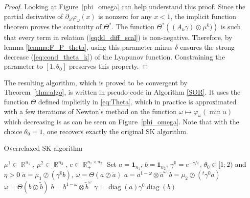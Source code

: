 \documentclass{article} %
\DeclareMathOperator{\IR}{\mathbb{R}}
\DeclareMathOperator{\diag}{diag}
\renewcommand{\epsilon}{\varepsilon}
\theoremstyle{plain}
\theoremstyle{definition}
\theoremstyle{remark}
\begin{document}
\begin{proof}
Looking at Figure~\ref{phi_omega} can help understand this proof.	Since the partial derivative of $\partial_\omega \varphi_\omega(x)$ is nonzero for any $x<1$, the implicit function theorem proves the continuity of $\Theta^*$.
	The function $\Theta^*\left((A_k \gamma)\oslash \mu^k)\right)$ is such that every term in relation (\ref{eq:kl_diff_scal}) is non-negative.
	Therefore, by lemma \ref{lemma:F_P_theta}, using this parameter minus $\delta$ ensures the strong decrease (\ref{eq:cond_theta_k}) of the Lyapunov function.
	Constraining the parameter to $[1,\theta_0]$ preserves this property.%
\end{proof}

The resulting algorithm, which is proved to be convergent by Theorem~\ref{thm:algo}, is written in pseudo-code in Algorithm \ref{SOR}. It uses the function $\Theta$ defined implicitly in \eqref{eq:Theta}, which in practice is approximated with a few iterations of Newton's method on the function $\omega \mapsto \varphi_\omega(\min u)$ which decreasing is as can be seen on Figure~\ref{phi_omega}. Note that with the choice $\theta_0=1$, one recovers exactly the original SK algorithm.

\begin{algorithm}
\caption{Overrelaxed SK algorithm }
\label{SOR}
\begin{algorithmic}
\REQUIRE $\mu^1\in \IR^{n_1}$, $\mu^2\in \IR^{n_2}$, $c\in \IR^{n_1\times n_2}_+$
\STATE Set $a=\mathbf{1}_{n_1}$, $b=\mathbf{1}_{n_2}$, $\gamma^0=e^{-c/\epsilon}$, $\theta_0\in[1;2)$ and $\eta>0$
\STATE $\tilde a=\mu_1\oslash (\gamma^0 b)$, 
\STATE $\omega=\Theta(a\oslash\tilde a)$
\STATE  $a=a^{1-\omega}\otimes \tilde a^\omega$
\STATE $\tilde b=\mu_2\oslash (^t\gamma^0  a)$
\STATE $\omega=\Theta(b\oslash\tilde b)$
\STATE  $b=b^{1-\omega}\otimes \tilde b^\omega$%
\ENDWHILE
 \RETURN $\gamma=\diag(a)\gamma^0\diag(b)$
\end{algorithmic}
\end{algorithm}
\end{document}
